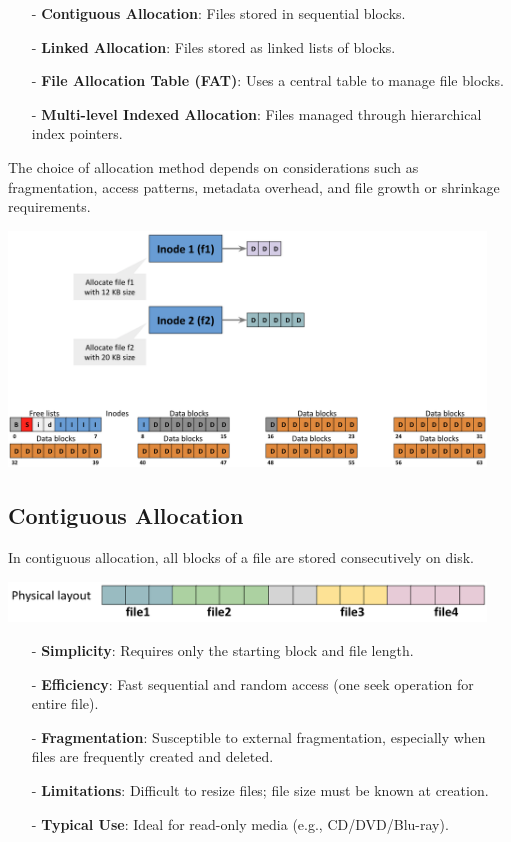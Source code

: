 \documentclass[../../compsys.tex]{subfiles}
\begin{document}
\begin{itemize}[itemsep=2pt, topsep=1pt]
    \item[-] \textbf{Contiguous Allocation}: Files stored in sequential blocks.
    \item[-] \textbf{Linked Allocation}: Files stored as linked lists of blocks.
    \item[-] \textbf{File Allocation Table (FAT)}: Uses a central table to manage file blocks.
    \item[-] \textbf{Multi-level Indexed Allocation}: Files managed through hierarchical index pointers.
\end{itemize}

The choice of allocation method depends on considerations such as fragmentation, access patterns, metadata overhead, and file growth or shrinkage requirements.

\begin{center}
    \includegraphics[width=0.95\textwidth]{chapters/L6/images/alloc.png}
\end{center}
\newpage
\subsection{Contiguous Allocation}
In contiguous allocation, all blocks of a file are stored consecutively on disk.
\begin{center}
  \includegraphics[width=0.95\textwidth]{chapters/L6/images/contiguous.png}
\end{center}


\begin{itemize}[itemsep=2pt, topsep=1pt]
    \item[-] \textbf{Simplicity}: Requires only the starting block and file length.
    \item[-] \textbf{Efficiency}: Fast sequential and random access (one seek operation for entire file).
    \item[-] \textbf{Fragmentation}: Susceptible to external fragmentation, especially when files are frequently created and deleted.
    \item[-] \textbf{Limitations}: Difficult to resize files; file size must be known at creation.
    \item[-] \textbf{Typical Use}: Ideal for read-only media (e.g., CD/DVD/Blu-ray).
\end{itemize}
\end{document}

